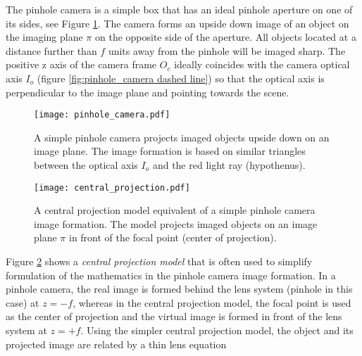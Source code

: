 \documentclass[12pt,a4paper,oneside,pdftex]{report}
\begin{document}

The pinhole camera is a simple box that has an ideal pinhole aperture on one of its sides, see Figure \ref{fig:pinhole_camera}. The camera forms an upside down image of an object on the imaging plane $\pi$ on the opposite side of the aperture. All objects located at a distance further than $f$ units away from the pinhole will be imaged sharp. The positive z axis of the camera frame $O_c$ ideally coincides with the camera optical axis $I_o$ (figure \ref{fig:pinhole_camera dashed line}) so that the optical axis is perpendicular to the image plane and pointing towards the scene. 

\begin{figure}[ht]
  \begin{center}
    \texttt{[image: pinhole\_camera.pdf]}
    \caption{A simple pinhole camera projects imaged objects upside down on an image plane. The image formation is based on similar triangles between the optical axis $I_o$ and the red light ray (hypothenus).}
    \label{fig:pinhole_camera}
  \end{center}
\end{figure}

\begin{figure}[ht]
  \begin{center}
    \texttt{[image: central\_projection.pdf]}
    \caption{A central projection model equivalent of a simple pinhole camera image formation. The model projects imaged objects on an image plane $\pi$ in front of the focal point (center of projection).}
    \label{fig:central_projection}
  \end{center}
\end{figure}

Figure \ref{fig:central_projection} shows a \emph{central projection model} that is often used to simplify formulation of the mathematics in the pinhole camera image formation. In a pinhole camera, the real image is formed behind the lens system (pinhole in this case) at $z = -f$, whereas in the central projection model, the focal point is used as the center of projection and the virtual image is formed in front of the lens system at $z = +f$. Using the simpler central projection model, the object and its projected image are related by a thin lens equation
\end{document}
